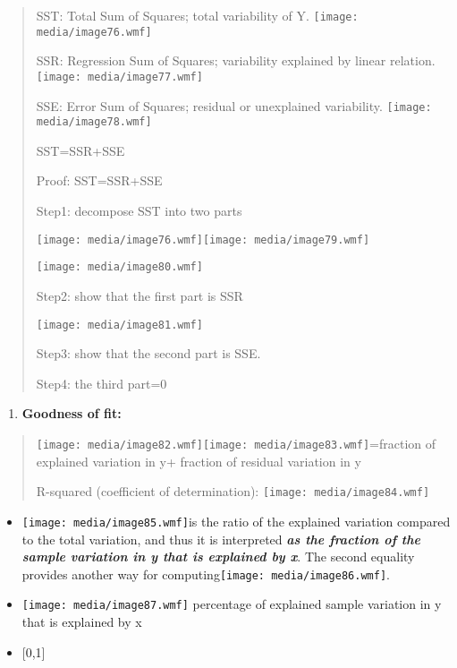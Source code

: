 \begin{quote}
SST: Total Sum of Squares; total variability of Y.
\texttt{[image: media/image76.wmf]}

SSR: Regression Sum of Squares; variability explained by linear
relation. \texttt{[image: media/image77.wmf]}

SSE: Error Sum of Squares; residual or unexplained variability.
\texttt{[image: media/image78.wmf]}

SST=SSR+SSE

Proof: SST=SSR+SSE

Step1: decompose SST into two parts

\texttt{[image: media/image76.wmf]}\texttt{[image: media/image79.wmf]}

\texttt{[image: media/image80.wmf]}

Step2: show that the first part is SSR

\texttt{[image: media/image81.wmf]}

Step3: show that the second part is SSE.

Step4: the third part=0
\end{quote}

\begin{enumerate}
\def\labelenumi{\alph{enumi}.}
\setcounter{enumi}{1}
\item
  \textbf{Goodness of fit:}
\end{enumerate}

\begin{quote}
\texttt{[image: media/image82.wmf]}\texttt{[image: media/image83.wmf]}=fraction
of explained variation in y+ fraction of residual variation in y

R-squared (coefficient of determination):
\texttt{[image: media/image84.wmf]}
\end{quote}

\begin{itemize}
\item
  \texttt{[image: media/image85.wmf]}is the ratio of the explained
  variation compared to the total variation, and thus it is interpreted
  \emph{\textbf{as the fraction of the sample variation in y that is
  explained by x}}. The second equality provides another way for
  computing\texttt{[image: media/image86.wmf]}.
\item
  \texttt{[image: media/image87.wmf]} percentage of explained sample
  variation in y that is explained by x
\item
  {[}0,1{]}
\end{itemize}

